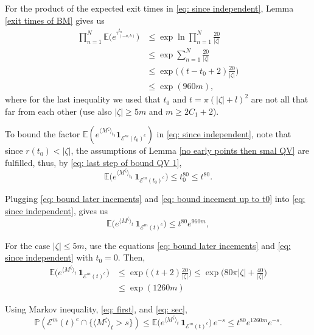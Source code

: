 \documentclass[11pt]{article}
\makeatletter
\renewenvironment{proof}[1][\proofname]{
   \par\pushQED{\qed}\normalfont
   \topsep6\p@\@plus6\p@\relax
   \trivlist\item[\hskip\labelsep\bfseries#1\@addpunct{.}]
   \ignorespaces
}{
   \popQED\endtrivlist\@endpefalse
}
\numberwithin{equation}{section}
\def\Ex{\mathbb{E}}
\def\QV{\langle M ^{\zeta} \rangle}
\makeatother
\begin{document}
\begin{proof}[Proof of Lemma \ref{No early point then small QV 2}]
  For the product of the expected exit times in \eqref{eq: since independent}, 
  Lemma \ref{exit times of BM} gives us
  \begin{equation} \label{eq: bound later incements}
    \begin{split}
      \prod_{n=1}^N  \Ex \Big( e^{\tau^{t_n}_{(-a,b)}} \Big)
      & \leq \exp  \ln  \prod_{n=1}^N \frac{20}{|\zeta|} \\
      & \leq \exp \sum_{n=1}^N \frac{20}{|\zeta|} \\
      & \leq \exp \bigg( (t-t_0 +2) \frac{20}{|\zeta|} \bigg) \\
      & \leq \exp (960 m),
    \end{split}
  \end{equation}
  where for the last inequality we used that $t_0$ and $t = \pi(|\zeta| +l)^2$ 
  are not all that far from each other (use also $|\zeta| \geq 5m$ and $m \geq 2C_1 + 2$).

  To bound the factor $\Ex (e^{\QV_{t_0}}  \boldsymbol{1}_{\mathcal{E}^m(t_0)^c})$ 
  in \eqref{eq: since independent}, note that since \hbox{$r(t_0) < |\zeta|$}, 
  the assumptions of Lemma \ref{no early points then smal QV} are fulfilled, 
  thus, by \eqref{eq: last step of bound QV 1},
  \begin{equation}\label{eq: bound incement up to t0}
    \Ex \big( e^{\QV_{t_0}} \, \boldsymbol{1}_{\mathcal{E}^m(t_0)^c} \big)
    \leq t_0^{80} \leq t^{80}.
  \end{equation}

  Plugging \eqref{eq: bound later incements} and \eqref{eq: bound incement up to t0}  
  into \eqref{eq: since independent}, gives us
  \begin{equation}\label{eq: first}
     \Ex \big( e^{\QV_{t}} \,  \boldsymbol{1}_{\mathcal{E}^m(t)^c} \big)
        \leq t^{80} e^{960m},
  \end{equation}

  For the case $|\zeta| \leq 5m$, use the equations 
  \eqref{eq: bound later incements} and \eqref{eq: since independent} with $t_0 = 0$. Then,
  \begin{equation}\label{eq: sec}
    \begin{split}
      \Ex \big( e^{\QV_{t}} \,  \boldsymbol{1}_{\mathcal{E}^m(t)^c} \big)
      &\leq \exp\Big( (t+2)\frac{20}{|\zeta|} \Big)
      \leq \exp \Big( 80\pi|\zeta| + \frac{40}{|\zeta|} \Big)\\
      &\leq \exp (1260m)
    \end{split}
  \end{equation}

  Using Markov inequality, \eqref{eq: first}, and \eqref{eq: sec},
  \begin{equation*}
    \mathbb{P}(\mathcal{E}^{m} (t) ^c \cap \{ \langle M^{\zeta} \rangle _t > s \})
      \leq \Ex \big( e^{\QV_{t}} \, 
      \boldsymbol{1}_{\mathcal{E}^m(t)^c} \big)\, e^{-s}
        \leq t^{80} e^{1260m} e^{-s}. 
  \end{equation*}
\end{proof}
\end{document}
